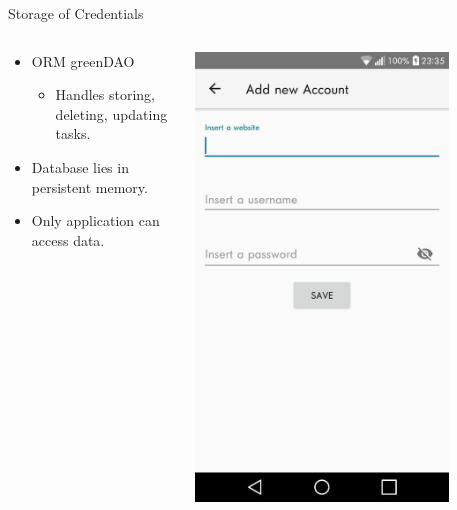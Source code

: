 \documentclass{beamer}
\begin{document}
\begin{frame}{Storage of Credentials}
\vspace{-10mm}
	\begin{columns}[onlytextwidth]
		\begin{column}{0.7\textwidth}
			\begin{itemize}
				\item ORM greenDAO
				\begin{itemize}
					\item Handles storing, deleting, updating tasks.
				\end{itemize}
				\item Database lies in persistent memory.
				\item Only application can access data.
			\end{itemize}
		\end{column}
		\begin{column}{0.3\textwidth}
			\begin{center}
			\includegraphics[width=0.8\textwidth]{images/AddAccountActivity.jpg} \\
			\end{center}
		\end{column}
	\end{columns}
\end{frame}
\end{document}
